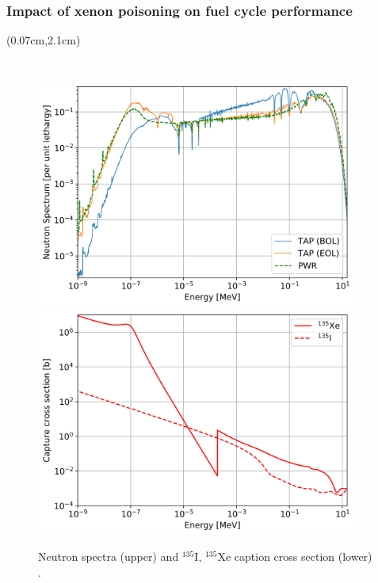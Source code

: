 \begin{frame}
\frametitle{Impact of xenon poisoning on fuel cycle performance}
\begin{textblock*}{12.4cm}(0.07cm,2.1cm) %
	\begin{columns}
		\column[t]{5.5cm}
		\vspace{-5mm}
		{\begin{figure}[hbp!] %
			\includegraphics[width=0.94\textwidth]{../dissertation/figures/ch5/tap_vs_pwr_spectrum_2.png}\\
			\vspace{-5mm}
			\hspace{+0.05mm}
			\includegraphics[width=0.94\textwidth]{../dissertation/figures/ch5/i_xe_xs.png}
			\vspace{-3mm}
			\caption{Neutron spectra (upper) and $^{135}$I, $^{135}$Xe caption 
			cross section (lower) \cite{rykhlevskii_impact_2019}.}
		\end{figure}}
		

\end{columns}
\end{textblock*}
\end{frame}
